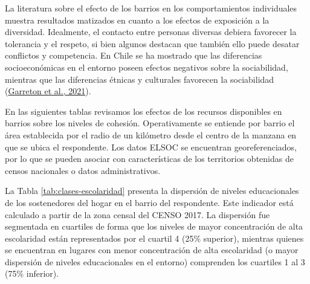 \documentclass[
  12pt,
]{book}
\begin{document}
La literatura sobre el efecto de los barrios en los comportamientos individuales muestra resultados matizados en cuanto a los efectos de exposición a la diversidad. Idealmente, el contacto entre personas diversas debiera favorecer la tolerancia y el respeto, si bien algunos destacan que también ello puede desatar conflictos y competencia. En Chile se ha mostrado que las diferencias socioeconómicas en el entorno poseen efectos negativos sobre la sociabilidad, mientras que las diferencias étnicas y culturales favorecen la sociabilidad (\protect\hyperlink{ref-garreton_social_2021}{Garreton et al., 2021}).

En las siguientes tablas revisamos los efectos de los recursos disponibles en barrios sobre los niveles de cohesión. Operativamente se entiende por barrio el área establecida por el radio de un kilómetro desde el centro de la manzana en que se ubica el respondente. Los datos ELSOC se encuentran georeferenciados, por lo que se pueden asociar con características de los territorios obtenidas de censos nacionales o datos administrativos.

La Tabla \ref{tab:clases-escolaridad} presenta la dispersión de niveles educacionales de los sostenedores del hogar en el barrio del respondente. Este indicador está calculado a partir de la zona censal del CENSO 2017. La dispersión fue segmentada en cuartiles de forma que los niveles de mayor concentración de alta escolaridad están representados por el cuartil 4 (25\% superior), mientras quienes se encuentran en lugares con menor concentración de alta escolaridad (o mayor dispersión de niveles educacionales en el entorno) comprenden los cuartiles 1 al 3 (75\% inferior).

\begin{table}

\caption{\label{tab:clases-escolaridad}Efecto del promedio de escolaridad del barrio sobre las clases de cohesion social}
\centering
{}
\end{table}
\end{document}
